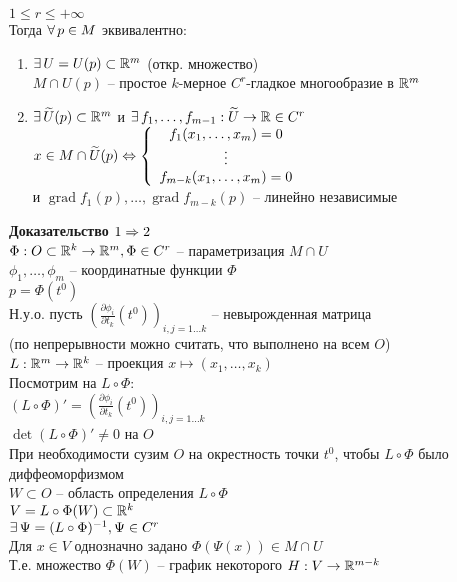 \documentclass[12pt]{article}
\DeclareMathOperator{\grad}{grad}
\newcommand{\ppart}[2]{\frac{\partial #1}{\partial #2}}
\begin{document}
$1 \leq r \leq +\infty$\\
Тогда $\forall\, p \in M$ эквивалентно:
\begin{enumerate}
    \item $\exists\, U = U(p) \subset \mathbb{R}^m$ (откр. множество)\\
    $M \cap U(p)$ -- простое $k$-мерное $C^r$-гладкое многообразие в $\mathbb{R}^m$
    \item $\exists\, \widetilde U(p)\subset \mathbb{R}^m$ и $\exists\, f_1,\ldots, f_{m-1}: \widetilde U\rightarrow \mathbb{R} \in C^r$\\
    $x\in M\cap \widetilde U(p)\Leftrightarrow \left\{\begin{array}{c}
        f_1(x_1,\ldots, x_m) = 0\\
        \vdots\\
        f_{m-k}(x_1,\ldots, x_m) = 0
    \end{array}\right.$\\
    и $\grad f_1(p), \ldots, \grad f_{m-k} (p)$ -- линейно независимые
\end{enumerate}
\textbf{Доказательство $1\Rightarrow 2$}\\
$\Phi: O\subset \mathbb{R}^k \rightarrow \mathbb{R}^m, \Phi\in C^r$ -- параметризация $M\cap U$\\
$\phi_1, \ldots, \phi_m$ -- координатные функции $\Phi$\\
$p = \Phi(t^0)$\\
Н.у.о. пусть $(\ppart{\phi_i}{t_k}(t^0))_{i,j=1\ldots k}$ -- невырожденная матрица\\
(по непрерывности можно считать, что выполнено на всем $O$)\\
$L: \mathbb{R}^m \rightarrow \mathbb{R}^k$ -- проекция $x\mapsto (x_1,\ldots, x_k)$\\
Посмотрим на $L\circ \Phi$:\\
$(L\circ \Phi)' = (\ppart{\phi_i}{t_k}(t^0))_{i,j=1\ldots k}$\\
$\det (L\circ \Phi)' \neq 0$ на $O$\\
При необходимости сузим $O$ на окрестность точки $t^0$, чтобы $L\circ \Phi$ было диффеоморфизмом\\
$W \subset O$ -- область определения $L\circ \Phi$\\
$V = L\circ \Phi(W) \subset \mathbb{R}^k$\\
$\exists\, \Psi = (L\circ \Phi)^{-1}, \Psi\in C^r$\\ 
Для $x \in V$ однозначно задано $\Phi(\Psi(x)) \in M\cap U$\\
Т.е. множество $\Phi(W)$ -- график некоторого $H: V\rightarrow \mathbb{R}^{m-k}$\\
\end{document}
